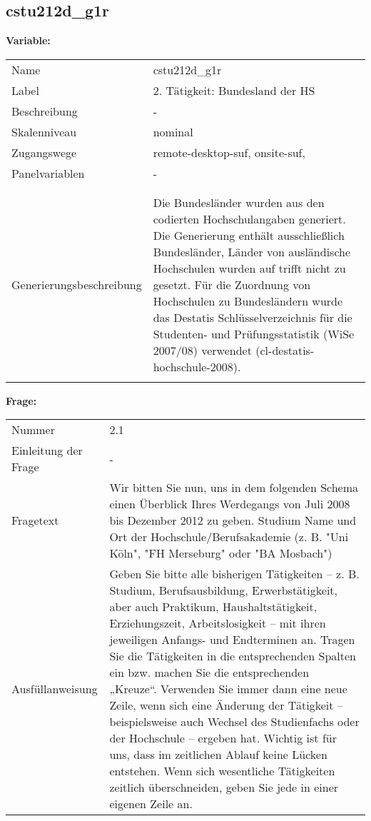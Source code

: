 	
	
	\subsection{cstu212d\_g1r}
	\label{subSection:cstu212d_g1r}

	\noindent\textbf{Variable:}\\
		\begin{tabular}{lL{11.3cm}}
			\label{tableVariable:cstu212d_g1r}
			Name & cstu212d\_g1r \\
			Label & 2. Tätigkeit: Bundesland der HS \\
			Beschreibung & - \\
			Skalenniveau & nominal \\
			Zugangswege &
				remote-desktop-suf,
				onsite-suf,
 \\
			Panelvariablen & -
			 \\
			 \\
 \\
					Generierungsbeschreibung & Die Bundesländer wurden aus den codierten Hochschulangaben generiert. Die Generierung enthält ausschließlich Bundesländer, Länder von ausländische Hochschulen wurden auf trifft nicht zu gesetzt. Für die Zuordnung von Hochschulen zu Bundesländern wurde das Destatis Schlüsselverzeichnis für die Studenten- und Prüfungsstatistik (WiSe 2007/08) verwendet (cl-destatis-hochschule-2008).
				 \\	
			 \\
		\end{tabular}

		\vspace*{1 cm}
		\noindent\textbf{Frage:}\\
		\begin{tabular}{lL{11.3cm}}
			\label{tableQuestion:cstu212d_g1r}
			Nummer & 2.1 \\
			Einleitung der Frage & - \\
			Fragetext & Wir bitten Sie nun, uns in dem folgenden Schema einen Überblick Ihres Werdegangs von Juli 2008 bis Dezember 2012 zu geben.
Studium
Name und Ort der Hochschule/Berufsakademie
(z. B. "Uni Köln", "FH Merseburg" oder "BA Mosbach") \\
			Ausfüllanweisung & Geben Sie bitte alle bisherigen Tätigkeiten – z. B. Studium, Berufsausbildung, Erwerbstätigkeit, aber auch Praktikum, Haushaltstätigkeit,
Erziehungszeit, Arbeitslosigkeit – mit ihren jeweiligen Anfangs- und Endterminen an. Tragen Sie die Tätigkeiten in die entsprechenden Spalten ein bzw. machen Sie die entsprechenden „Kreuze“. Verwenden Sie immer dann eine neue Zeile, wenn sich eine Änderung der Tätigkeit – beispielsweise auch Wechsel des Studienfachs oder der Hochschule – ergeben hat. Wichtig ist für uns, dass im zeitlichen Ablauf keine Lücken entstehen. Wenn sich wesentliche Tätigkeiten zeitlich überschneiden, geben Sie jede in einer eigenen Zeile an. \\
		\end{tabular}





